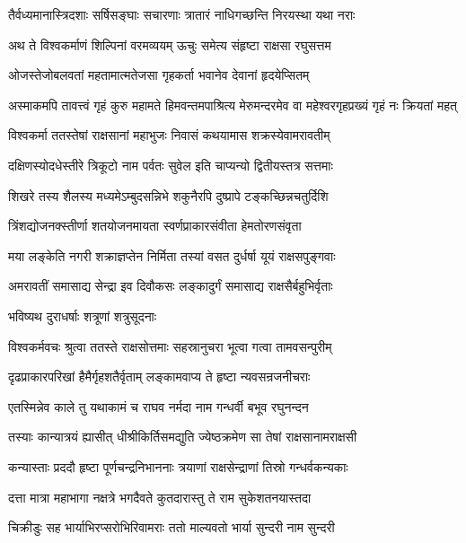 \twolineshloka
{तैर्वध्यमानास्त्रिदशाः सर्षिसङ्घाः सचारणाः}
{त्रातारं नाधिगच्छन्ति निरयस्था यथा नराः} %

\twolineshloka
{अथ ते विश्वकर्माणं शिल्पिनां वरमव्ययम्}
{ऊचुः समेत्य संहृष्टा राक्षसा रघुसत्तम} %

\twolineshloka
{ओजस्तेजोबलवतां महतामात्मतेजसा}
{गृहकर्ता भवानेव देवानां हृदयेप्सितम्} %

\threelineshloka
{अस्माकमपि तावत्त्वं गृहं कुरु महामते}
{हिमवन्तमपाश्रित्य मेरुमन्दरमेव वा}
{महेश्वरगृहप्रख्यं गृहं नः क्रियतां महत्} %

\twolineshloka
{विश्वकर्मा ततस्तेषां राक्षसानां महाभुजः}
{निवासं कथयामास शक्रस्येवामरावतीम्} %

\twolineshloka
{दक्षिणस्योदधेस्तीरे त्रिकूटो नाम पर्वतः}
{सुवेल इति चाप्यन्यो द्वितीयस्तत्र सत्तमाः} %

\twolineshloka
{शिखरे तस्य शैलस्य मध्यमेऽम्बुदसन्निभे}
{शकुनैरपि दुष्प्रापे टङ्कच्छिन्नचतुर्दिशि} %

\twolineshloka
{त्रिंशद्योजनक्स्तीर्णा शतयोजनमायता}
{स्वर्णप्राकारसंवीता हेमतोरणसंवृता} %

\twolineshloka
{मया लङ्केति नगरी शक्राज्ञप्तेन निर्मिता}
{तस्यां वसत दुर्धर्षा यूयं राक्षसपुङ्गवाः} %

\twolineshloka
{अमरावतीं समासाद्य सेन्द्रा इव दिवौकसः}
{लङ्कादुर्गं समासाद्य राक्षसैर्बहुभिर्वृताः} %

\onelineshloka
{भविष्यथ दुराधर्षाः शत्रूणां शत्रुसूदनाः} %

\twolineshloka
{विश्वकर्मवचः श्रुत्वा ततस्ते राक्षसोत्तमाः}
{सहस्रानुचरा भूत्वा गत्वा तामवसन्पुरीम्} %

\twolineshloka
{दृढप्राकारपरिखां हैमैर्गृहशतैर्वृताम्}
{लङ्कामवाप्य ते हृष्टा न्यवसन्रजनीचराः} %

\twolineshloka
{एतस्मिन्नेव काले तु यथाकामं च राघव}
{नर्मदा नाम गन्धर्वी बभूव रघुनन्दन} %

\twolineshloka
{तस्याः कान्यात्रयं ह्यासीत् धीश्रीकिर्तिसमद्युति}
{ज्येष्ठक्रमेण सा तेषां राक्षसानामराक्षसी} %

\twolineshloka
{कन्यास्ताः प्रददौ हृष्टा पूर्णचन्द्रनिभाननाः}
{त्रयाणां राक्षसेन्द्राणां तिस्रो गन्धर्वकन्यकाः} %

\twolineshloka
{दत्ता मात्रा महाभागा नक्षत्रे भगदैवते}
{कुतदारास्तु ते राम सुकेशतनयास्तदा} %

\twolineshloka
{चिक्रीडुः सह भार्याभिरप्सरोभिरिवामराः}
{ततो माल्यवतो भार्या सुन्दरी नाम सुन्दरी} %

